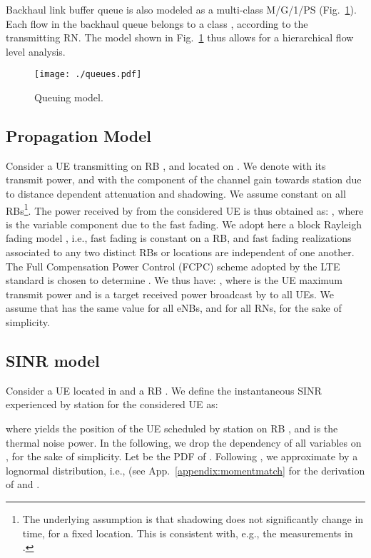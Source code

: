 \documentclass[draftcls,onecolumn]{IEEEtran}
\theoremstyle{plain}
\theoremstyle{definition}
\begin{document}
Backhaul link buffer queue is also modeled as a multi-class M/G/1/PS (Fig.~\ref{fig:queues}). Each flow in the backhaul queue belongs to a class , according to the transmitting RN. The model shown in Fig.~\ref{fig:queues} thus allows for a hierarchical flow level analysis. 
\begin{figure}
 \centering
\texttt{[image: ./queues.pdf]} 
 \caption{Queuing model.}
\label{fig:queues} 
\end{figure} 

\subsection{Propagation Model}
Consider a UE transmitting on RB , and located on . We denote with  its transmit power, and with  the component of the channel gain towards station  due to distance dependent attenuation and shadowing. We assume  constant on all RBs\footnote{The underlying assumption is that shadowing does not significantly change in time, for a fixed location. This is consistent with, e.g., the measurements in \cite{Kurose}.}. The power  received by  from the considered UE is thus obtained as: , 
where  is the variable component due to the fast fading. We adopt here a block Rayleigh fading model \cite{block_fading}, i.e., fast fading is constant on a RB, and fast fading realizations associated to any two distinct RBs or locations are independent of one another. The Full Compensation Power Control (FCPC) scheme adopted by the LTE standard \cite{36.814} is chosen to determine . We thus have:
,
where  is the UE maximum transmit power and  is a target received power broadcast by  to all UEs.
We assume that  has the same value  for all eNBs, and  for all RNs, for the sake of simplicity.    


\subsection{SINR model}\label{subsec:sinrmodel}
Consider a UE located in  and a RB . We define the instantaneous SINR  experienced by station  for the considered UE as:

where  yields the position of the UE scheduled by station  on RB , and  is the thermal noise power. In the following, we drop the dependency of all variables on , for the sake of simplicity. Let  be the PDF of . Following \cite{kostic, fischione}, we approximate  by a lognormal distribution, i.e.,  (see App.~\ref{appendix:momentmatch} for the derivation of  and .
\end{document}
